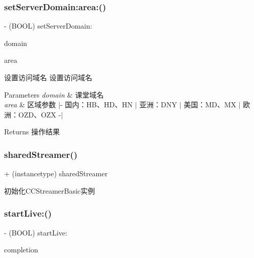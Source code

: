 \subsubsection{\texorpdfstring{set\+Server\+Domain\+:area\+:()}{setServerDomain:area:()}}
{\footnotesize\ttfamily -\/ (B\+O\+OL) set\+Server\+Domain\+: \begin{DoxyParamCaption}\item[{(N\+S\+String $\ast$)}]{domain }\item[{area:(N\+S\+String $\ast$)}]{area }\end{DoxyParamCaption}}

设置访问域名  设置访问域名 
\begin{DoxyParams}{Parameters}
{\em domain} & 课堂域名 \\
\hline
{\em area} & 区域参数 $\vert$-\/ 国内：\+H\+B、\+H\+D、\+HN $\vert$ 亚洲：\+D\+NY $\vert$ 美国：\+M\+D、\+MX $\vert$ 欧洲：\+O\+Z\+D、\+O\+ZX -\/$\vert$ \\
\hline
\end{DoxyParams}
\begin{DoxyReturn}{Returns}
操作结果 
\end{DoxyReturn}
\mbox{\label{interface_c_c_streamer_basic_a8bb923e9c31c4bb3a75e22117464d0aa}} 
\subsubsection{\texorpdfstring{shared\+Streamer()}{sharedStreamer()}}
{\footnotesize\ttfamily + (instancetype) shared\+Streamer \begin{DoxyParamCaption}{ }\end{DoxyParamCaption}}

初始化\+C\+C\+Streamer\+Basic实例 \mbox{\label{interface_c_c_streamer_basic_ad9f91717c4dd487f254ace9a7237af4d}} 
\subsubsection{\texorpdfstring{start\+Live\+:()}{startLive:()}}
{\footnotesize\ttfamily -\/ (B\+O\+OL) start\+Live\+: \begin{DoxyParamCaption}\item[{(C\+C\+Comletion\+Block)}]{completion }\end{DoxyParamCaption}}

